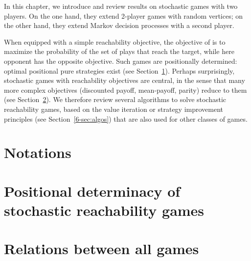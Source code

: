 

In this chapter, we introduce and review results on stochastic games
with two players. On the one hand, they extend 2-player games with
random vertices; on the other hand, they extend Markov decision
processes with a second player. 

When equipped with a simple reachability objective, the objective of
\Eve is to maximize the probability of the set of plays that reach the
target, while here opponent has the opposite objective. Such games are
positionally determined: optimal positional pure strategies exist (see
Section~\ref{6-sec:values}). Perhaps surprisingly, stochastic games
with reachability objectives are central, in the sense that many more
complex objectives (discounted payoff, mean-payoff, parity) reduce to
them (see Section~\ref{6-sec:relations}). We therefore review several
algorithms to solve stochastic reachability games, based on the value
iteration or strategy improvement principles (see
Section~\ref{6-sec:algos}) that are also used for other classes of
games.



\section*{Notations}


\section{Positional determinacy of stochastic reachability games}
\label{6-sec:values}
\label{6-sec:determinacy}



\section{Relations between all games}
\label{6-sec:relations}


